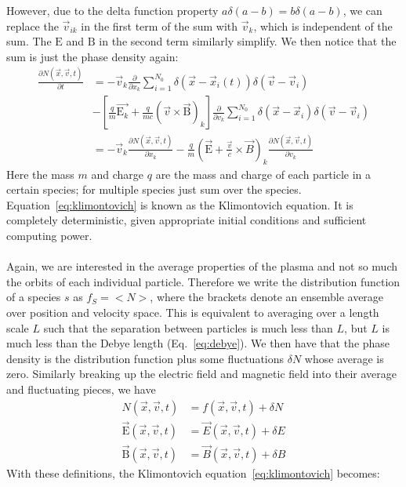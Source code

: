 However, due to the delta function property $a\delta(a-b)=b\delta(a-b)$, we can replace the $\vec v_{ik}$ in the first term of the sum with $\vec v_k$, which is independent of the sum. The $\mathrm{E}$ and $\mathrm{B}$ in the second term similarly simplify. We then notice that the sum is just the phase density again:
\begin{align}
  \frac{\partial N(\vec x,\vec v,t)}{\partial t}&=-\vec v_k\frac{\partial}{\partial x_k}\sum_{i=1}^{N_0} \delta(\vec x-\vec x_i(t))\delta(\vec v-\vec v_i)\nonumber\\
  &- \left[\frac{q}{m}\vec{\mathrm{E}_k}+\frac{q}{m c}(\vec v\times\vec{\mathrm{B}})_k\right]\frac{\partial}{\partial v_k}\sum_{i=1}^{N_0}\delta(\vec x-\vec x_i)\delta(\vec v-\vec v_i)\nonumber\\
  &=-\vec v_k\frac{\partial N(\vec x,\vec v,t)}{\partial x_k}-\frac qm\left(\vec{\mathrm{ E}}+\frac{\vec v}c\times\vec B\right)_k\frac{\partial N(\vec x,\vec v,t)}{\partial v_k}\label{eq:klimontovich}
\end{align}
Here the mass $m$ and charge $q$ are the mass and charge of each particle in a certain species; for multiple species just sum over the species. Equation~\ref{eq:klimontovich} is known as the Klimontovich equation. It is completely deterministic, given appropriate initial conditions and sufficient computing power. \\
\\
Again, we are interested in the average properties of the plasma and not so much the orbits of each individual particle. Therefore we write the distribution function of a species $s$ as $f_S=<N>$, where the brackets denote an ensemble average over position and velocity space. This is equivalent to averaging over a length scale $L$ such that the separation between particles is much less than $L$, but $L$ is much less than the Debye length (Eq.~\ref{eq:debye}). We then have that the phase density is the distribution function plus some fluctuations $\delta N$ whose average is zero. Similarly breaking up the electric field and magnetic field into their average and fluctuating pieces, we have
\begin{align*}
  N(\vec x,\vec v,t)&=f(\vec x,\vec v,t)+\delta N\\
  \mathrm{\vec E}(\vec x,\vec v,t)&=\vec E(\vec x,\vec v,t)+\delta E\\
  \mathrm{\vec B}(\vec x,\vec v,t)&=\vec B(\vec x,\vec v,t)+\delta B
\end{align*}
With these definitions, the Klimontovich equation~\ref{eq:klimontovich} becomes:
